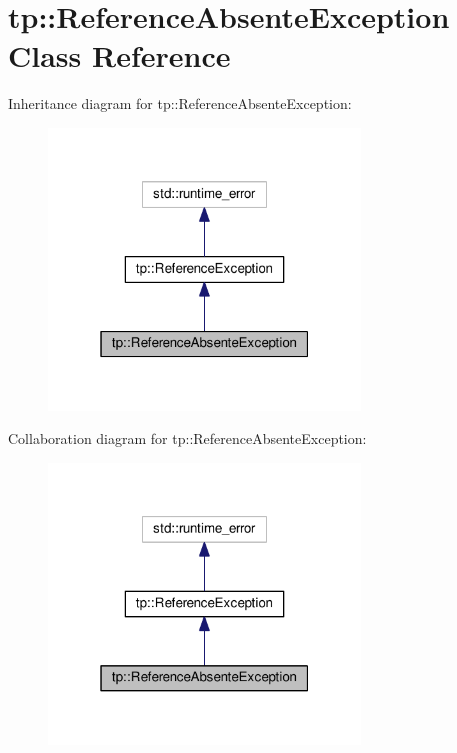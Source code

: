 \hypertarget{classtp_1_1ReferenceAbsenteException}{}\section{tp\+:\+:Reference\+Absente\+Exception Class Reference}
\label{classtp_1_1ReferenceAbsenteException}


Inheritance diagram for tp\+:\+:Reference\+Absente\+Exception\+:\nopagebreak
\begin{figure}[H]
\begin{center}
\leavevmode
\includegraphics[width=235pt]{classtp_1_1ReferenceAbsenteException__inherit__graph}
\end{center}
\end{figure}


Collaboration diagram for tp\+:\+:Reference\+Absente\+Exception\+:\nopagebreak
\begin{figure}[H]
\begin{center}
\leavevmode
\includegraphics[width=235pt]{classtp_1_1ReferenceAbsenteException__coll__graph}
\end{center}
\end{figure}
